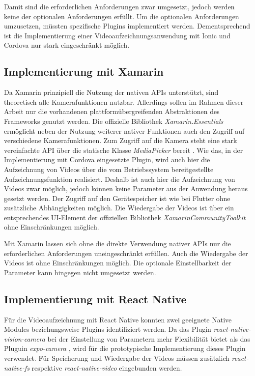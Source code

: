 Damit sind die erforderlichen Anforderungen zwar umgesetzt, jedoch werden keine der optionalen Anforderungen erfüllt.
Um die optionalen Anforderungen umzusetzen, müssten spezifische Plugins implementiert werden.
Dementsprechend ist die Implementierung einer Videoaufzeichnungsanwendung mit Ionic und Cordova nur stark eingeschränkt möglich.


\subsection{Implementierung mit Xamarin}
\label{sec:Evaluation_Xamarin}

Da Xamarin prinzipiell die Nutzung der nativen \acp{API} unterstützt, sind theoretisch alle Kamerafunktionen nutzbar.
Allerdings sollen im Rahmen dieser Arbeit nur die vorhandenen plattformübergreifenden Abstraktionen des Frameworks genutzt werden.
Die offizielle Bibliothek \textit{Xamarin.Essentials} ermöglicht neben der Nutzung weiterer nativer Funktionen auch den Zugriff auf verschiedene Kamerafunktionen.
Zum Zugriff auf die Kamera steht eine stark vereinfachte \ac{API} über die statische Klasse \textit{MediaPicker} bereit \cite{Xamarin_MediaPicker}.
Wie das, in der Implementierung mit Cordova eingesetzte Plugin, wird auch hier die Aufzeichnung von Videos über die vom Betriebssystem bereitgestellte Aufzeichnungsfunktion realisiert.
Deshalb ist auch hier die Aufzeichnung von Videos zwar möglich, jedoch können keine Parameter aus der Anwendung heraus gesetzt werden.
Der Zugriff auf den Gerätespeicher ist wie bei Flutter ohne zusätzliche Abhängigkeiten möglich.
Die Wiedergabe der Videos ist über ein entsprechendes \ac{UI}-Element der offiziellen Bibliothek \textit{XamarinCommunityToolkit} \cite{Xamarin_CommunityToolkit} ohne Einschränkungen möglich.

Mit Xamarin lassen sich ohne die direkte Verwendung nativer \acp{API} nur die erforderlichen Anforderungen uneingeschränkt erfüllen.
Auch die Wiedergabe der Videos ist ohne Einschränkungen möglich.
Die optionale Einstellbarkeit der Parameter kann hingegen nicht umgesetzt werden.


\subsection{Implementierung mit React Native}
\label{sec:Evaluation_ReactNative}

Für die Videoaufzeichnung mit React Native konnten zwei geeignete Native Modules beziehungsweise Plugins identifiziert werden.
Da das Plugin \textit{react-native-vision-camera} \cite{Vision_Canmera} bei der Einstellung von Parametern mehr Flexibilität bietet als das Pluguin \textit{expo-camera} \cite{Expo_Camera}, wird für die prototypische Implementierung dieses Plugin verwendet.
Für Speicherung und Wiedergabe der Videos müssen zusätzlich \textit{react-native-fs} \cite{ReactNative_FileSystem} respektive \textit{react-native-video} \cite{ReactNative_Video} eingebunden werden.

